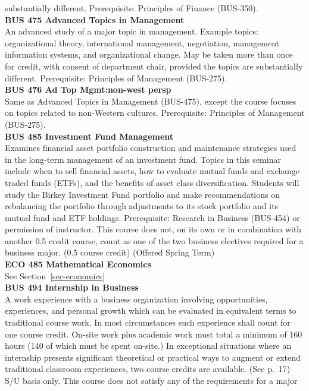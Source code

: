 \documentclass[
  letterpaper,
]{scrbook}
\begin{document}
substantially different. Prerequisite: Principles of Finance
(BUS-350).\\
\textbf{BUS 475 Advanced Topics in Management}\\
An advanced study of a major topic in management. Example topics:
organizational theory, international management, negotiation, management
information systems, and organizational change. May be taken more than
once for credit, with consent of department chair, provided the topics
are substantially different. Prerequisite: Principles of Management
(BUS-275).\\
\textbf{BUS 476 Ad Top Mgmt:non-west persp}\\
Same as Advanced Topics in Management (BUS-475), except the course
focuses on topics related to non-Western cultures. Prerequisite:
Principles of Management (BUS-275).\\
\textbf{BUS 485 Investment Fund Management}\\
Examines financial asset portfolio construction and maintenance
strategies used in the long-term management of an investment fund.
Topics in this seminar include when to sell financial assets, how to
evaluate mutual funds and exchange traded funds (ETFs), and the benefits
of asset class diversification. Students will study the Birkey
Investment Fund portfolio and make recommendations on rebalancing the
portfolio through adjustments to its stock portfolio and its mutual fund
and ETF holdings. Prerequisite: Research in Business (BUS-454) or
permission of instructor. This course does not, on its own or in
combination with another 0.5 credit course, count as one of the two
business electives required for a business major. (0.5 course credit)
(Offered Spring Term)\\
\textbf{ECO 485 Mathematical Economics}\\
See Section~\ref{sec-economics}\\
\textbf{BUS 494 Internship in Business}\\
A work experience with a business organization involving opportunities,
experiences, and personal growth which can be evaluated in equivalent
terms to traditional course work. In most circumstances such experience
shall count for one course credit. On-site work plus academic work must
total a minimum of 160 hours (140 of which must be spent on-site.) In
exceptional situations where an internship presents significant
theoretical or practical ways to augment or extend traditional classroom
experiences, two course credits are available. (See p.~17) S/U basis
only. This course does not satisfy any of the requirements for a major
\end{document}
